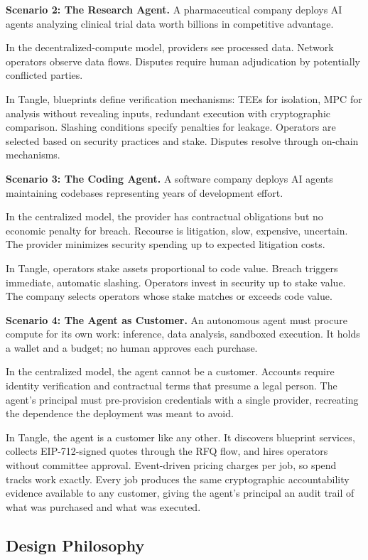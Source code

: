 \documentclass[11pt,a4paper]{article}
\begin{document}
\textbf{Scenario 2: The Research Agent.} A pharmaceutical company deploys AI agents analyzing clinical trial data worth billions in competitive advantage.

In the decentralized-compute model, providers see processed data. Network operators observe data flows. Disputes require human adjudication by potentially conflicted parties.

In Tangle, blueprints define verification mechanisms: TEEs for isolation, MPC for analysis without revealing inputs, redundant execution with cryptographic comparison. Slashing conditions specify penalties for leakage. Operators are selected based on security practices and stake. Disputes resolve through on-chain mechanisms.

\textbf{Scenario 3: The Coding Agent.} A software company deploys AI agents maintaining codebases representing years of development effort.

In the centralized model, the provider has contractual obligations but no economic penalty for breach. Recourse is litigation, slow, expensive, uncertain. The provider minimizes security spending up to expected litigation costs.

In Tangle, operators stake assets proportional to code value. Breach triggers immediate, automatic slashing. Operators invest in security up to stake value. The company selects operators whose stake matches or exceeds code value.

\textbf{Scenario 4: The Agent as Customer.} An autonomous agent must procure compute for its own work: inference, data analysis, sandboxed execution. It holds a wallet and a budget; no human approves each purchase.

In the centralized model, the agent cannot be a customer. Accounts require identity verification and contractual terms that presume a legal person. The agent's principal must pre-provision credentials with a single provider, recreating the dependence the deployment was meant to avoid.

In Tangle, the agent is a customer like any other. It discovers blueprint services, collects EIP-712-signed quotes through the RFQ flow, and hires operators without committee approval. Event-driven pricing charges per job, so spend tracks work exactly. Every job produces the same cryptographic accountability evidence available to any customer, giving the agent's principal an audit trail of what was purchased and what was executed.

\subsection{Design Philosophy}
\end{document}
